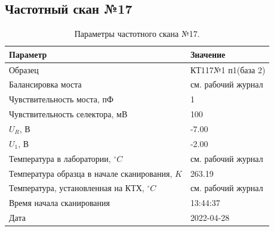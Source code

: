 \subsection{Частотный скан №17}
\begin{table}[!ht]
    \centering
    \caption{Параметры частотного скана №17.}
    \begin{tabular}{|l|l|}
        \hline
        Параметр                                       & Значение                  \\ \hline
        Образец                                        & КТ117№1 п1(база 2)        \\ \hline
        Балансировка моста                             & см. рабочий журнал        \\ \hline
        Чувствительность моста, пФ                     & 1                         \\ \hline
        Чувствительность селектора, мВ                 & 100                       \\ \hline
        $U_R$, В                                       & -7.00                     \\ \hline
        $U_1$, В                                       & -2.00                     \\ \hline
        Температура в лаборатории, $^\circ C$          & см. рабочий журнал        \\ \hline
        Температура образца в начале сканирования, $K$ & 263.19                    \\ \hline
        Температура, установленная на КТХ, $^\circ C$  & см. рабочий журнал        \\ \hline
        Время начала сканирования                      & 13:44:37                  \\ \hline
        Дата                                           & 2022-04-28                \\ \hline
    \end{tabular}
    \label{table:frequency_scan_17}
\end{table}

